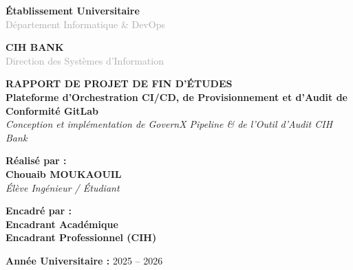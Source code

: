 \documentclass[12pt,a4paper]{report}
\begin{document}
\begin{titlepage}
    \centering
    
    \begin{minipage}{0.48\textwidth}
        \begin{left}
            \textbf{\Large Établissement Universitaire}\\
            \textcolor{darkGray}{\small Département Informatique \& DevOps}
        \end{left}
    \end{minipage}
    \hfill
    \begin{minipage}{0.48\textwidth}
        \begin{right}
            \textbf{\Large CIH BANK}\\
            \textcolor{darkGray}{\small Direction des Systèmes d'Information}
        \end{right}
    \end{minipage}
    
    \vfill
    \hr[2pt]
    \vspace{0.8cm}
    
    {\Huge \bfseries \color{primaryColor} RAPPORT DE PROJET DE FIN D'ÉTUDES} \\[0.5cm]
    {\Large \bfseries \color{secondaryColor} Plateforme d'Orchestration CI/CD, de Provisionnement et d'Audit de Conformité GitLab} \\[0.3cm]
    {\large \textit{Conception et implémentation de GovernX Pipeline \& de l'Outil d'Audit CIH Bank}}
    
    \vspace{0.8cm}
    \hr[1pt]
    \vfill
    
    \begin{minipage}{0.48\textwidth}
        \Large
        \textbf{Réalisé par :}\\
        \textcolor{primaryColor}{\textbf{Chouaib MOUKAOUIL}}\\[0.3cm]
        \small
        \textit{Élève Ingénieur / Étudiant}
    \end{minipage}
    \hfill
    \begin{minipage}{0.48\textwidth}
        \Large
        \begin{right}
            \textbf{Encadré par :}\\
            \textcolor{primaryColor}{\textbf{Encadrant Académique}}\\
            \textcolor{primaryColor}{\textbf{Encadrant Professionnel (CIH)}}\\[0.3cm]
        \end{right}
    \end{minipage}
    
    \vfill
    
    \textbf{Année Universitaire :} 2025 -- 2026
\end{titlepage}
\end{document}
